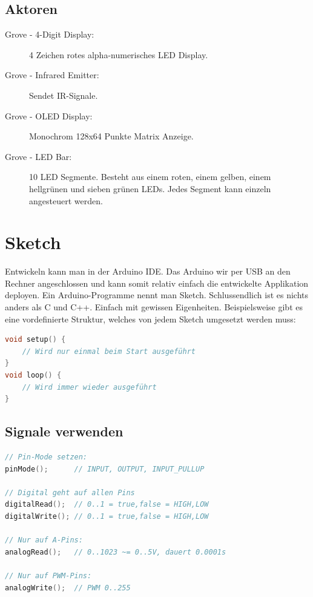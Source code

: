 \subsection{Aktoren}
\begin{description}
	\item[Grove - 4-Digit Display:] 4 Zeichen rotes alpha-numerisches LED Display.
	\item[Grove - Infrared Emitter:] Sendet IR-Signale.
	\item[Grove - OLED Display:] Monochrom 128x64 Punkte Matrix Anzeige.
	\item[Grove - LED Bar:] 10 LED Segmente. Besteht aus einem roten, einem gelben, einem hellgrünen und sieben	grünen LEDs. Jedes Segment kann einzeln angesteuert werden.
\end{description}

\section{Sketch}
Entwickeln kann man in der Arduino IDE. Das Arduino wir per USB an den Rechner angeschlossen und kann somit relativ einfach die entwickelte Applikation deployen. Ein Arduino-Programme nennt man Sketch. Schlussendlich ist es nichts anders als C und C++. Einfach mit gewissen Eigenheiten. Beispielsweise gibt es eine vordefinierte Struktur, welches von jedem Sketch umgesetzt werden muss:

\begin{lstlisting}[language=C, caption=Sketch Struktur]
void setup() {
	// Wird nur einmal beim Start ausgeführt
}
void loop() {
	// Wird immer wieder ausgeführt
}
\end{lstlisting}

\subsection{Signale verwenden}
\begin{lstlisting}[language=C, caption=Signale verwenden]
// Pin-Mode setzen:
pinMode(); 		// INPUT, OUTPUT, INPUT_PULLUP

// Digital geht auf allen Pins
digitalRead(); 	// 0..1 = true,false = HIGH,LOW
digitalWrite(); // 0..1 = true,false = HIGH,LOW

// Nur auf A-Pins:
analogRead(); 	// 0..1023 ~= 0..5V, dauert 0.0001s

// Nur auf PWM-Pins:
analogWrite(); 	// PWM 0..255
\end{lstlisting}

